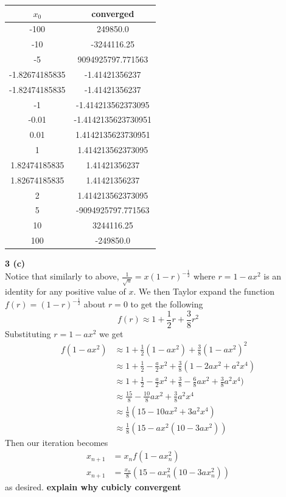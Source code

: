 \documentclass[12pt]{article}
\newcommand{\problem}[1]{\hspace{-4 ex} \large \textbf{#1}\\}
\begin{document}
	\begin{center}
		\begin{tabular}{|c|c|}
			\hline
			$x_0$&converged\\ \hline
			-100&249850.0\\ \hline
			-10&-3244116.25\\ \hline
			-5&9094925797.771563\\ \hline
			-1.82674185835&-1.41421356237\\ \hline
			-1.82474185835&-1.41421356237\\ \hline
			-1&-1.414213562373095\\ \hline
			-0.01&-1.4142135623730951\\ \hline
			0.01&1.4142135623730951\\ \hline
			1&1.414213562373095\\ \hline
			1.82474185835&1.41421356237\\ \hline
			1.82674185835&1.41421356237\\ \hline
			2&1.414213562373095\\ \hline
			5&-9094925797.771563\\ \hline
			10&3244116.25\\ \hline
			100&-249850.0\\ \hline
		\end{tabular}
	\end{center}
	
\problem{3 (c)}
	Notice that similarly to above, $\frac{1}{\sqrt{a}}=x(1-r)^{-\frac{1}{2}}$ where $r=1-ax^2$ is an identity for any positive value of $x$. We then Taylor expand the function $f(r)=(1-r)^{-\frac{1}{2}}$ about $r=0$ to get the following
	$$
	f(r) \approx 1 + \frac{1}{2}r + \frac{3}{8}r^2
	$$
	Substituting $r=1-ax^2$ we get
	\begin{align*}
		f(1-ax^2) & \approx 1 + \frac{1}{2}(1-ax^2) + \frac{3}{8}(1-ax^2)^2\\
		& \approx 1 + \frac{1}{2} - \frac{a}{2}x^2 + \frac{3}{8}(1-2ax^2 + a^2x^4) \\
		& \approx 1 + \frac{1}{2} - \frac{a}{2}x^2 + \frac{3}{8} -\frac{6}{8}ax^2 + \frac{3}{8}a^2x^4) \\
		& \approx \frac{15}{8} - \frac{10}{8}ax^2 + \frac{3}{8}a^2x^4\\
		& \approx \frac{1}{8}(15 - 10ax^2 + 3a^2x^4)\\
		& \approx \frac{1}{8}(15 - ax^2(10 - 3ax^2))
	\end{align*}
	Then our iteration becomes
	\begin{align*}
		x_{n+1} & = x_nf(1-ax_n^2) \\
		x_{n+1} & = \frac{x_n}{8}(15 - ax_n^2(10 - 3ax_n^2))
	\end{align*}
	as desired. \textbf{explain why cubicly convergent} \\
	
\end{document}

